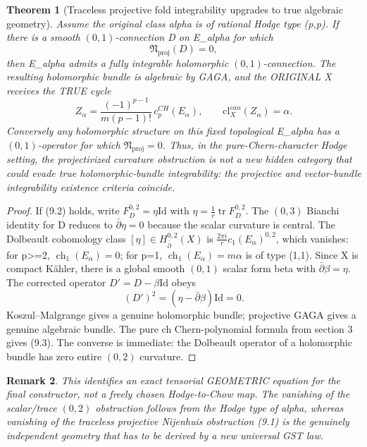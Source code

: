 \documentclass[11pt]{article}
\newtheorem{theorem}{Theorem}[section]
\newtheorem{remark}[theorem]{Remark}
\begin{document}
\begin{theorem}[Traceless projective fold integrability upgrades to true algebraic geometry]
Assume the original class alpha is of rational
Hodge type (p,p). If there is a smooth
$(0,1)$-connection D on E_alpha for which
\[
 \boxed{\mathfrak N_{\mathrm{proj}}(D)=0,}       \tag{9.2}
\]
then E_alpha admits a \emph{fully integrable}
holomorphic $(0,1)$-connection. The resulting
holomorphic bundle is algebraic by GAGA,
and the ORIGINAL X receives the TRUE
cycle
\[
 \boxed{
 Z_\alpha=
   \frac{(-1)^{p-1}}{m(p-1)!}\,
         c_p^{CH}(E_\alpha),\qquad
 \mathrm{cl}^{can}_X(Z_\alpha)=\alpha .
 }                                                        \tag{9.3}
\]
Conversely any holomorphic structure
on this fixed topological E_alpha has
a $(0,1)$-operator for which
$\mathfrak N_{\mathrm{proj}}=0$.
Thus, in the pure-Chern-character Hodge
setting, the projectivized
curvature obstruction is not a
new hidden category that could evade
true holomorphic-bundle integrability:
the projective and vector-bundle
integrability existence criteria coincide.
\end{theorem}
\begin{proof}
If (9.2) holds, write
$F_D^{0,2}=\eta\mathrm{Id}$ with
$\eta=\frac1r\operatorname{tr}F_D^{0,2}$.
The $(0,3)$ Bianchi identity for D
reduces to $\bar\partial\eta=0$
because the scalar curvature is central.
The Dolbeault cohomology class
$[\eta]\in H^{0,2}_{\bar\partial}(X)$
is $\frac{2\pi i}{r}c_1(E_\alpha)^{0,2}$,
which vanishes: for p>=2,
$\operatorname{ch}_1(E_\alpha)=0$;
for p=1, $\operatorname{ch}_1(E_\alpha)
=m\alpha$ is of type (1,1).
Since X is compact K\"ahler,
there is a global smooth $(0,1)$
scalar form beta with
$\bar\partial\beta=\eta$.
The corrected operator
$D'=D-\beta\mathrm{Id}$ obeys
\[
 (D')^2=(\eta-\bar\partial\beta)
           \mathrm{Id}=0.
\]
Koszul--Malgrange gives a genuine
holomorphic bundle; projective GAGA
gives a genuine algebraic bundle.
The pure ch Chern-polynomial formula
from section 3 gives (9.3).
The converse is immediate: the Dolbeault
operator of a holomorphic bundle has
zero entire $(0,2)$ curvature.
\end{proof}
\begin{remark}
This identifies an exact tensorial
GEOMETRIC equation for the final
constructor, not a freely chosen
Hodge-to-Chow map. The vanishing of
the scalar/trace $(0,2)$ obstruction
follows from the Hodge type of alpha,
whereas vanishing of the
\emph{traceless} projective Nijenhuis
obstruction (9.1) is the genuinely
independent geometry that has to
be derived by a new universal GST law.
\end{remark}
\end{document}
